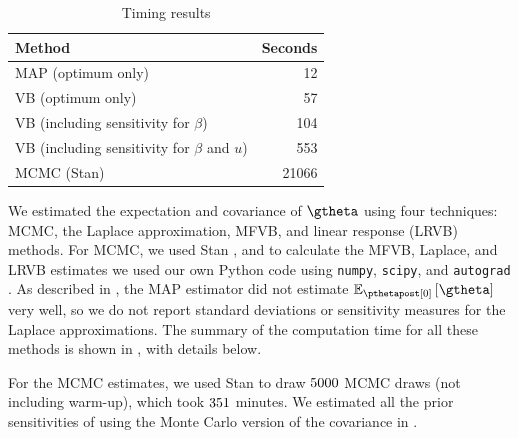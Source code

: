 \documentclass{article}\usepackage[]{graphicx}\usepackage[]{color}
\theoremstyle{definition}
\theoremstyle{plain}
\theoremstyle{plain}
\theoremstyle{plain}
\theoremstyle{definition}
\theoremstyle{plain}
\theoremstyle{plain}
\begin{document}
\begin{table}[h]
\begin{center}\begin{tabular}{lr}
  \hline
Method & Seconds \\ 
  \hline
MAP (optimum only) & 12 \\ 
  VB (optimum only) & 57 \\ 
  VB (including sensitivity for $\beta$) & 104 \\ 
  VB (including sensitivity for $\beta$ and $u$) & 553 \\ 
  MCMC (Stan) & 21066 \\ 
   \hline
\end{tabular}
\end{center}
\caption{Timing results\label{tab:timing}}
\end{table}

We estimated the expectation and covariance of $\gtheta$ using four
techniques: MCMC, the Laplace approximation, MFVB, and linear response
(LRVB) methods. For MCMC, we used Stan \citep{stan-manual:2015},
and to calculate the MFVB, Laplace, and LRVB estimates we used our
own Python code using \texttt{numpy}, \texttt{scipy}, and \texttt{autograd}
\citep{scipy,maclaurin:2015:autograd}. As described in ,
the MAP estimator did not estimate $\mbe_{\pzeropost}\left[\gtheta\right]$
very well, so we do not report standard deviations or sensitivity
measures for the Laplace approximations. The summary of the computation
time for all these methods is shown in , with
details below.

For the MCMC estimates, we used Stan to draw $5000$
MCMC draws (not including warm-up), which took $351$
minutes. We estimated all the prior sensitivities of 
using the Monte Carlo version of the covariance in .
\end{document}
